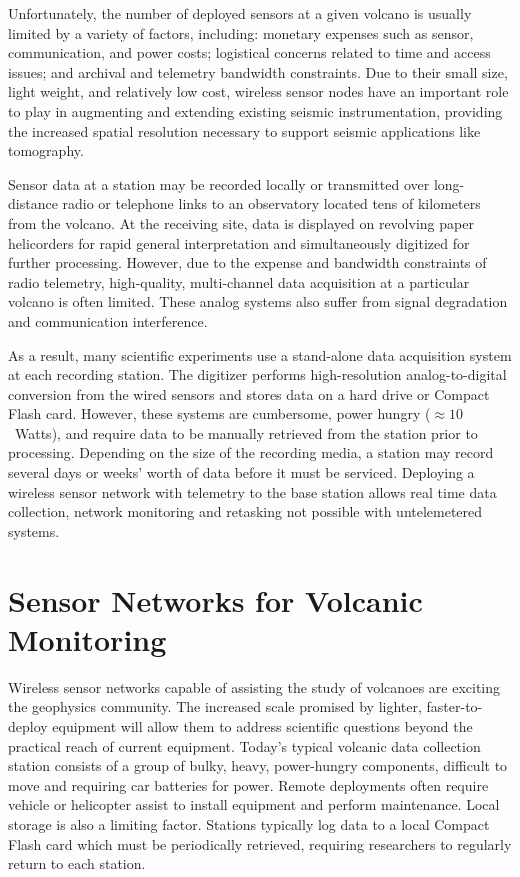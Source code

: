 Unfortunately, the number of deployed sensors at a given volcano is usually
limited by a variety of factors, including: monetary expenses such as sensor,
communication, and power costs; logistical concerns related to time and access
issues; and archival and telemetry bandwidth constraints. Due to their small
size, light weight, and relatively low cost, wireless sensor nodes have an
important role to play in augmenting and extending existing seismic
instrumentation, providing the increased spatial resolution necessary to
support seismic applications like tomography.

Sensor data at a station may be recorded locally or transmitted over
long-distance radio or telephone links to an observatory located tens of
kilometers from the volcano.  At the receiving site, data is displayed on
revolving paper helicorders for rapid general interpretation and
simultaneously digitized for further processing.  However, due to the expense
and bandwidth constraints of radio telemetry, high-quality, multi-channel
data acquisition at a particular volcano is often limited. These analog
systems also suffer from signal degradation and communication interference.

As a result, many scientific experiments use a stand-alone data acquisition
system at each recording station.  The digitizer performs high-resolution
analog-to-digital conversion from the wired sensors and stores data on a hard
drive or Compact Flash card. However, these systems are cumbersome, power
hungry ($\approx 10$~Watts), and require data to be manually retrieved from
the station prior to processing. Depending on the size of the recording
media, a station may record several days or weeks' worth of data before it
must be serviced. Deploying a wireless sensor network with telemetry to the
base station allows real time data collection, network monitoring and
retasking not possible with untelemetered systems.


\section{Sensor Networks for Volcanic Monitoring}

Wireless sensor networks capable of assisting the study of volcanoes are exciting the
geophysics community.  The increased scale promised by lighter,
faster-to-deploy equipment will allow them to address scientific questions
beyond the practical reach of current equipment.  Today's
typical volcanic data collection station consists of a group of bulky,
heavy, power-hungry components, difficult to move and requiring car batteries
for power.  Remote deployments often require vehicle or helicopter assist to
install equipment and perform maintenance.  Local storage is also a
limiting factor.  Stations typically log data to a local Compact Flash card
which must be periodically retrieved, requiring researchers to regularly
return to each station.

